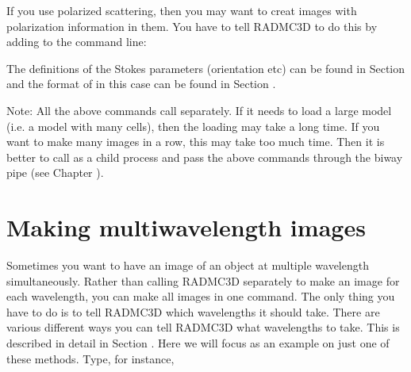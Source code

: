 \documentclass[letterpaper,10pt,english]{sphinxmanual}
\begin{document}
 If you use polarized scattering,
then you may want to creat images with polarization information in them. You
have to tell RADMC\sphinxhyphen{}3D to do this by adding  to the command line:

\begin{sphinxVerbatim}[commandchars=\\\{\}]
        
\end{sphinxVerbatim}

The definitions of the Stokes parameters (orientation etc) can be found in
Section {\hyperref[\detokenize{dustradtrans:sec-definitions-stokes}]{}} and the format of  in this
case can be found in Section {\hyperref[\detokenize{inputoutputfiles:sec-image-out}]{}}.

Note: All the above commands call  separately. If it needs to load a
large model (i.e. a model with many cells), then the loading may take a long
time. If you want to make many images in a row, this may take too much
time. Then it is better to call  as a child process and pass the
above commands through the biway pipe (see Chapter ).


\section{Making multi\sphinxhyphen{}wavelength images}
\label{\detokenize{imagesspectra:making-multi-wavelength-images}}\label{\detokenize{imagesspectra:sec-multi-wavelength-images}}
Sometimes you want to have an image of an object at multiple wavelength
simultaneously. Rather than calling RADMC\sphinxhyphen{}3D separately to make an image for
each wavelength, you can make all images in one command. The only thing you have
to do is to tell RADMC\sphinxhyphen{}3D which wavelengths it should take. There are various
different ways you can tell RADMC\sphinxhyphen{}3D what wavelengths to take. This is described
in detail in Section {\hyperref[\detokenize{imagesspectra:sec-set-camera-frequencies}]{}}. Here we will focus as an
example on just one of these methods. Type, for instance,
\end{document}
